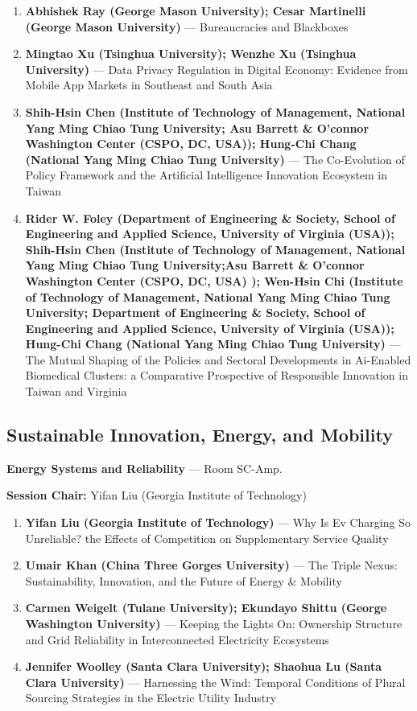 \documentclass[
  10pt,
  letterpaper,
  DIV=11,
  numbers=noendperiod]{scrartcl}
\begin{document}
\begin{enumerate}
\def\labelenumi{\arabic{enumi}.}
\item
  \textbf{Abhishek Ray (George Mason University); Cesar Martinelli
  (George Mason University)} --- Bureaucracies and Blackboxes
\item
  \textbf{Mingtao Xu (Tsinghua University); Wenzhe Xu (Tsinghua
  University)} --- Data Privacy Regulation in Digital Economy: Evidence
  from Mobile App Markets in Southeast and South Asia
\item
  \textbf{Shih-Hsin Chen (Institute of Technology of Management,
  National Yang Ming Chiao Tung University; Asu Barrett \& O'connor
  Washington Center (CSPO, DC, USA)); Hung-Chi Chang (National Yang Ming
  Chiao Tung University)} --- The Co-Evolution of Policy Framework and
  the Artificial Intelligence Innovation Ecosystem in Taiwan
\item
  \textbf{Rider W. Foley (Department of Engineering \& Society, School
  of Engineering and Applied Science, University of Virginia (USA));
  Shih-Hsin Chen (Institute of Technology of Management, National Yang
  Ming Chiao Tung University;Asu Barrett \& O'connor Washington Center
  (CSPO, DC, USA) ); Wen-Hsin Chi (Institute of Technology of
  Management, National Yang Ming Chiao Tung University; Department of
  Engineering \& Society, School of Engineering and Applied Science,
  University of Virginia (USA)); Hung-Chi Chang (National Yang Ming
  Chiao Tung University)} --- The Mutual Shaping of the Policies and
  Sectoral Developments in Ai-Enabled Biomedical Clusters: a Comparative
  Prospective of Responsible Innovation in Taiwan and Virginia
\end{enumerate}

\subsection{\texorpdfstring{\textcolor{sustainability}{Sustainable Innovation, Energy, and Mobility}}{}}\label{section-46}

\textbf{Energy Systems and Reliability} --- Room SC-Amp.

\textbf{Session Chair:} Yifan Liu (Georgia Institute of Technology)

\begin{enumerate}
\def\labelenumi{\arabic{enumi}.}
\item
  \textbf{Yifan Liu (Georgia Institute of Technology)} --- Why Is Ev
  Charging So Unreliable? the Effects of Competition on Supplementary
  Service Quality
\item
  \textbf{Umair Khan (China Three Gorges University)} --- The Triple
  Nexus: Sustainability, Innovation, and the Future of Energy \&
  Mobility
\item
  \textbf{Carmen Weigelt (Tulane University); Ekundayo Shittu (George
  Washington University)} --- Keeping the Lights On: Ownership Structure
  and Grid Reliability in Interconnected Electricity Ecosystems
\item
  \textbf{Jennifer Woolley (Santa Clara University); Shaohua Lu (Santa
  Clara University)} --- Harnessing the Wind: Temporal Conditions of
  Plural Sourcing Strategies in the Electric Utility Industry
\end{enumerate}
\end{document}
